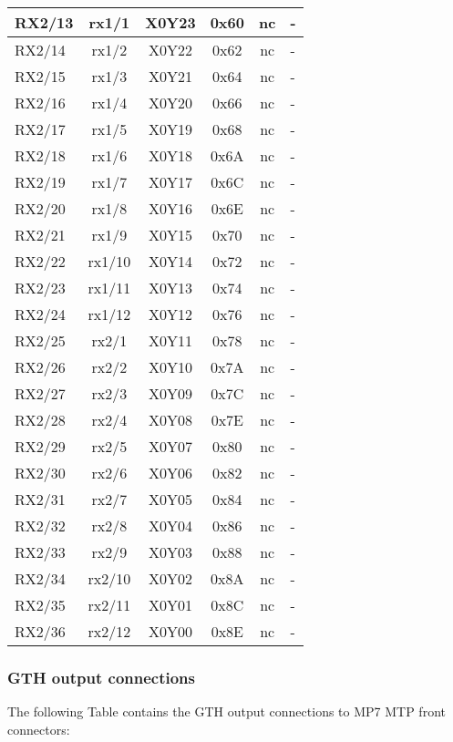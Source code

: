 \begin{longtable}{|l|c|c|c|c|l|}
RX2/13 & rx1/1  & X0Y23 & 0x60 & nc & -\\\hline
RX2/14 & rx1/2  & X0Y22 & 0x62 & nc & -\\\hline
RX2/15 & rx1/3  & X0Y21 & 0x64 & nc & -\\\hline
RX2/16 & rx1/4  & X0Y20 & 0x66 & nc & -\\\hline
RX2/17 & rx1/5  & X0Y19 & 0x68 & nc & -\\\hline
RX2/18 & rx1/6  & X0Y18 & 0x6A & nc & -\\\hline
RX2/19 & rx1/7  & X0Y17 & 0x6C & nc & -\\\hline
RX2/20 & rx1/8  & X0Y16 & 0x6E & nc & -\\\hline
RX2/21 & rx1/9  & X0Y15 & 0x70 & nc & -\\\hline
RX2/22 & rx1/10 & X0Y14 & 0x72 & nc & -\\\hline
RX2/23 & rx1/11 & X0Y13 & 0x74 & nc & -\\\hline
RX2/24 & rx1/12 & X0Y12 & 0x76 & nc & -\\\hline
RX2/25 & rx2/1  & X0Y11 & 0x78 & nc & -\\\hline
RX2/26 & rx2/2  & X0Y10 & 0x7A & nc & -\\\hline
RX2/27 & rx2/3  & X0Y09 & 0x7C & nc & -\\\hline
RX2/28 & rx2/4  & X0Y08 & 0x7E & nc & -\\\hline
RX2/29 & rx2/5  & X0Y07 & 0x80 & nc & -\\\hline
RX2/30 & rx2/6  & X0Y06 & 0x82 & nc & -\\\hline
RX2/31 & rx2/7  & X0Y05 & 0x84 & nc & -\\\hline
RX2/32 & rx2/8  & X0Y04 & 0x86 & nc & -\\\hline
RX2/33 & rx2/9  & X0Y03 & 0x88 & nc & -\\\hline
RX2/34 & rx2/10 & X0Y02 & 0x8A & nc & -\\\hline
RX2/35 & rx2/11 & X0Y01 & 0x8C & nc & -\\\hline
RX2/36 & rx2/12 & X0Y00 & 0x8E & nc & -\\\hline
\end{longtable}

\subsubsection{GTH output connections}\label{sec:app:gth_o_conn}

The following Table contains the GTH output connections to MP7 MTP front connectors:

